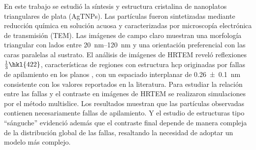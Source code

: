 En este trabajo se estudió la síntesis y estructura cristalina de nanoplatos triangulares de plata (AgTNPs). Las partículas fueron sintetizadas mediante reducción química en solución acuosa y caracterizadas por microscopía electrónica de transmisión (TEM). 
Las imágenes de campo claro muestran una morfología triangular con lados entre \qtyrange{20}{120}{\nano\meter} y una orientación preferencial con las caras  paralelas al sustrato. 
El análisis de imágenes de HRTEM reveló reflexiones $\frac{1}{3}\hkl{422}$, características de regiones con estructura hcp originadas por fallas de apilamiento en los planos , con un espaciado interplanar de \SI{0.26 \pm 0.1}{\nano\meter} consistente con los valores reportados en la literatura. Para estudiar la relación entre las fallas y el contraste en imágenes de HRTEM se realizaron simulaciones por el método multislice. 
Los resultados muestran que las partículas observadas contienen necesariamente fallas de apilamiento. 
Y el estudio de estructuras tipo ``sánguche'' evidenció además que el contraste final depende de manera compleja de la distribución global de las fallas, resaltando la necesidad de adoptar un modelo más complejo.
